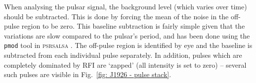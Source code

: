 
When analysing the pulsar signal, the background level (which varies over time) should be subtracted. This is done by forcing the mean of the noise in the off-pulse region to be zero. This baseline subtraction is fairly simple given that the variations are slow compared to the pulsar's period, and has been done using the \texttt{pmod} tool in \textsc{psrsalsa} \citep{Wxxx2016}. The off-pulse region is identified by eye and the baseline is subtracted from each individual pulse separately. In addition, pulses which are completely dominated by RFI are `zapped' (all intensity is set to zero) -- several such pulses are visible in Fig.~\ref{fig: J1926 - pulse stack}.

